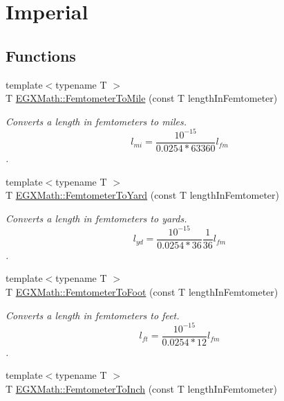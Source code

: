 \hypertarget{group___e_g_x_math-_conversions-_length_conversions-_femtometer-_imperial}{}\section{Imperial}
\label{group___e_g_x_math-_conversions-_length_conversions-_femtometer-_imperial}
\subsection*{Functions}
\begin{DoxyCompactItemize}
\item 
{\footnotesize template$<$typename T $>$ }\\T \mbox{\hyperlink{group___e_g_x_math-_conversions-_length_conversions-_femtometer-_imperial_ga8973c4ada3a3bc89034978a0ba7c2693}{E\+G\+X\+Math\+::\+Femtometer\+To\+Mile}} (const T length\+In\+Femtometer)
\begin{DoxyCompactList}\small\item\em Converts a length in femtometers to miles. \[ l_{mi}=\frac{10^{-15}}{0.0254 * 63360} l_{fm} \]. \end{DoxyCompactList}\item 
{\footnotesize template$<$typename T $>$ }\\T \mbox{\hyperlink{group___e_g_x_math-_conversions-_length_conversions-_femtometer-_imperial_ga4416c9d0cb07df4b86f23afe6b7f6e91}{E\+G\+X\+Math\+::\+Femtometer\+To\+Yard}} (const T length\+In\+Femtometer)
\begin{DoxyCompactList}\small\item\em Converts a length in femtometers to yards. \[ l_{yd}= \frac{10^{-15}}{0.0254 * 36} \frac{1}{36} l_{fm} \]. \end{DoxyCompactList}\item 
{\footnotesize template$<$typename T $>$ }\\T \mbox{\hyperlink{group___e_g_x_math-_conversions-_length_conversions-_femtometer-_imperial_gaa33efbf3b5cee0874ad44736c0ac6fd2}{E\+G\+X\+Math\+::\+Femtometer\+To\+Foot}} (const T length\+In\+Femtometer)
\begin{DoxyCompactList}\small\item\em Converts a length in femtometers to feet. \[ l_{ft}= \frac{10^{-15}}{0.0254 * 12} l_{fm} \]. \end{DoxyCompactList}\item 
{\footnotesize template$<$typename T $>$ }\\T \mbox{\hyperlink{group___e_g_x_math-_conversions-_length_conversions-_femtometer-_imperial_ga51c3107a7cfac96232eb0b040c3192a1}{E\+G\+X\+Math\+::\+Femtometer\+To\+Inch}} (const T length\+In\+Femtometer)

\end{DoxyCompactItemize}
